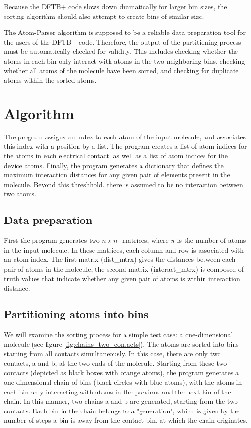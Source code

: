 \documentclass[11pt,a4paper]{article}
\begin{document}
Because the DFTB+ code slows down dramatically for larger bin sizes, the sorting algorithm should also attempt to create bins of similar size.

The Atom-Parser algorithm is supposed to be a reliable data preparation tool for the users of the DFTB+ code. Therefore, the output of the partitioning process must be automatically checked for validity. This includes checking whether the atoms in each bin only interact with atoms in the two neighboring bins, checking whether all atoms of the molecule have been sorted, and checking for duplicate atoms within the sorted atoms. 


\section{Algorithm}

The program assigns an index to each atom of the input molecule, and associates this index with a position by a list. The program creates a list of atom indices for the atoms in each electrical contact, as well as a list of atom indices for the device atoms. Finally, the program generates a dictionary that defines the maximum interaction distances for any given pair of elements present in the molecule. Beyond this threshhold, there is assumed to be no interaction between two atoms.

\subsection{Data preparation}
First the program generates two $n \times n$ -matrices, where $n$ is the number of atoms in the input molecule. In these matrices, each column and row is associated with an atom index. The first matrix (dist\_mtrx) gives the distances between each pair of atoms in the molecule, the second matrix (interact\_mtrx) is composed of truth values that indicate whether any given pair of atoms is within interaction distance.

\newpage

\subsection{Partitioning atoms into bins}

We will examine the sorting process for a simple test case: a one-dimensional molecule (see figure \ref{fig:chains_two_contacts}). The atoms are sorted into bins starting from all contacts simultaneously. In this case, there are only two contacts, a and b, at the two ends of the molecule. Starting from these two contacts (depicted as black boxes with orange atoms), the program generates a one-dimensional chain of bins (black circles with blue atoms), with the atoms in each bin only interacting with atoms in the previous and the next bin of the chain. In this manner, two chains a and b are generated, starting from the two contacts. Each bin in the chain belongs to a "generation", which is given by the number of steps a bin is away from the contact bin, at which the chain originates.
\end{document}
